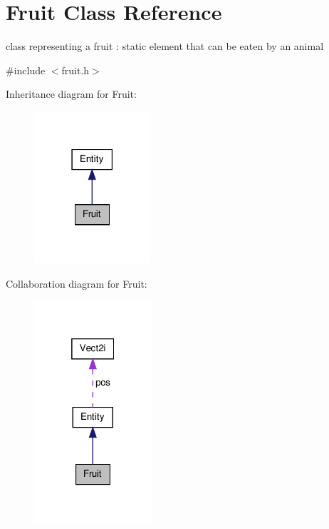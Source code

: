 \hypertarget{class_fruit}{\section{Fruit Class Reference}
\label{class_fruit}
}


class representing a fruit \-: static element that can be eaten by an animal  




{\ttfamily \#include $<$fruit.\-h$>$}



Inheritance diagram for Fruit\-:
\nopagebreak
\begin{figure}[H]
\begin{center}
\leavevmode
\includegraphics[width=122pt]{class_fruit__inherit__graph}
\end{center}
\end{figure}


Collaboration diagram for Fruit\-:
\nopagebreak
\begin{figure}[H]
\begin{center}
\leavevmode
\includegraphics[width=124pt]{class_fruit__coll__graph}
\end{center}
\end{figure}
